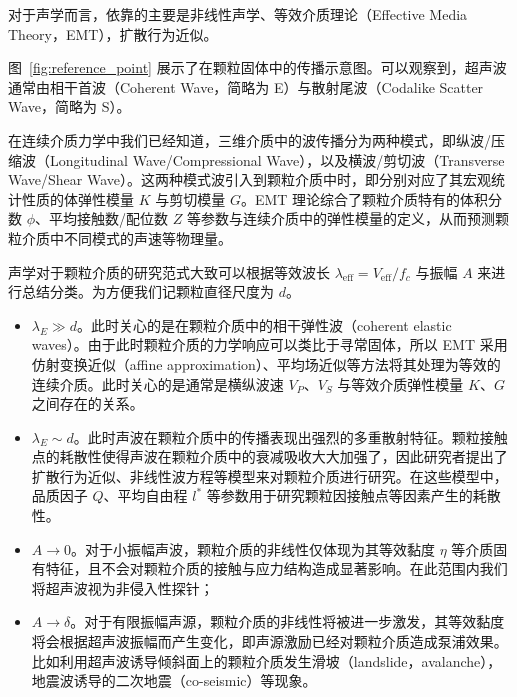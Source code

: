 
对于声学而言，依靠的主要是非线性声学\cite{10.1029/93JB02974}、等效介质理论（Effective Media Theory，EMT）\cite{WALTON1987213}，扩散行为近似。

图~\ref{fig:reference_point} 展示了在颗粒固体中的传播示意图。可以观察到，超声波通常由相干首波（Coherent Wave，简略为 E）与散射尾波（Codalike Scatter Wave，简略为 S）。 %

在连续介质力学中我们已经知道，三维介质中的波传播分为两种模式，即纵波/压缩波（Longitudinal Wave/Compressional Wave），以及横波/剪切波（Transverse Wave/Shear Wave）。这两种模式波引入到颗粒介质中时，即分别对应了其宏观统计性质的体弹性模量 $K$ 与剪切模量 $G$。EMT 理论综合了颗粒介质特有的体积分数 $\phi$、平均接触数/配位数 $Z$ 等参数与连续介质中的弹性模量的定义，从而预测颗粒介质中不同模式的声速等物理量。

声学对于颗粒介质的研究范式大致可以根据等效波长 $\lambda_{\text{eff}} = V_{\text{eff}}/f_{c}$ 与振幅 $A$ 来进行总结分类。为方便我们记颗粒直径尺度为 $d$。

\begin{itemize}
  \item $\lambda_{E}\gg d$。此时关心的是在颗粒介质中的相干弹性波（coherent elastic waves）。由于此时颗粒介质的力学响应可以类比于寻常固体，所以 EMT 采用仿射变换近似（affine approximation）、平均场近似等方法将其处理为等效的连续介质。此时关心的是通常是横纵波速 $V_{P}$、$V_{S}$ 与等效介质弹性模量 $K$、$G$ 之间存在的关系。
  \item $\lambda_{E}\sim d$。此时声波在颗粒介质中的传播表现出强烈的多重散射特征。颗粒接触点的耗散性使得声波在颗粒介质中的衰减吸收大大加强了，因此研究者提出了扩散行为近似\cite{PhysRevLett.93.154303}、非线性波方程\cite{Transitional,hamilton_nonlinear_1998}等模型来对颗粒介质进行研究。在这些模型中，品质因子 $Q$、平均自由程 $l^{*}$ 等参数用于研究颗粒因接触点等因素产生的耗散性。
  \item $A\rightarrow 0$。对于小振幅声波，颗粒介质的非线性仅体现为其等效黏度 $\eta$ 等介质固有特征，且不会对颗粒介质的接触与应力结构造成显著影响。在此范围内我们将超声波视为非侵入性探针；
  \item $A\rightarrow \delta$。对于有限振幅声源，颗粒介质的非线性将被进一步激发，其等效黏度将会根据超声波振幅而产生变化，即声源激励已经对颗粒介质造成泵浦效果。比如利用超声波诱导倾斜面上的颗粒介质发生滑坡（landslide，avalanche）\cite{PhysRevE.102.042901}，地震波诱导的二次地震（co-seismic）\cite{Johnson_2005}等现象。
\end{itemize}